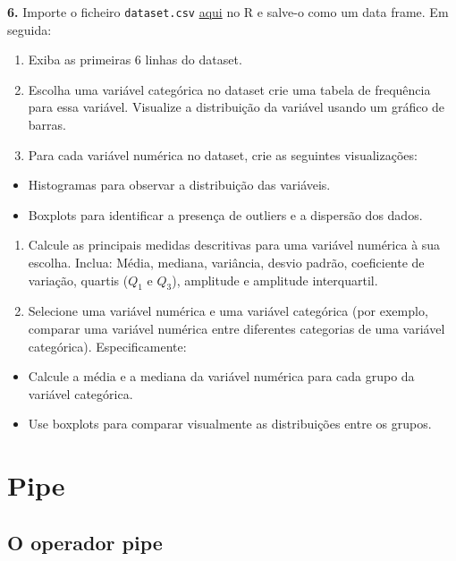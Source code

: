 \documentclass[
]{book}
\providecommand{\tightlist}{%
  \setlength{\itemsep}{0pt}\setlength{\parskip}{0pt}}
\begin{document}
\textbf{6.} Importe o ficheiro \texttt{dataset.csv} \href{https://renatorpaula.wixsite.com/renato/laboratorio-estatistica}{aqui} no R e salve-o como um data frame. Em seguida:

\begin{enumerate}
\def\labelenumi{(\alph{enumi})}
\item
  Exiba as primeiras 6 linhas do dataset.
\item
  Escolha uma variável categórica no dataset crie uma tabela de frequência para essa variável. Visualize a distribuição da variável usando um gráfico de barras.
\item
  Para cada variável numérica no dataset, crie as seguintes visualizações:
\end{enumerate}

\begin{itemize}
\tightlist
\item
  Histogramas para observar a distribuição das variáveis.
\item
  Boxplots para identificar a presença de outliers e a dispersão dos dados.
\end{itemize}

\begin{enumerate}
\def\labelenumi{(\alph{enumi})}
\setcounter{enumi}{3}
\item
  Calcule as principais medidas descritivas para uma variável numérica à sua escolha. Inclua: Média, mediana, variância, desvio padrão, coeficiente de variação, quartis (\(Q_1\) e \(Q_3\)), amplitude e amplitude interquartil.
\item
  Selecione uma variável numérica e uma variável categórica (por exemplo, comparar uma variável numérica entre diferentes categorias de uma variável categórica). Especificamente:
\end{enumerate}

\begin{itemize}
\tightlist
\item
  Calcule a média e a mediana da variável numérica para cada grupo da variável categórica.
\item
  Use boxplots para comparar visualmente as distribuições entre os grupos.
\end{itemize}

\chapter{Pipe}\label{pipe}

\section{O operador pipe}\label{o-operador-pipe}
\end{document}
